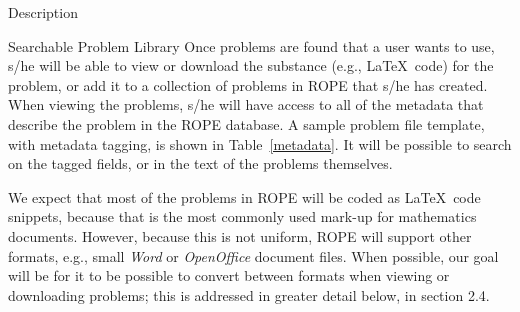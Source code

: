 \documentclass[11pt]{article}
\begin{document}
\begin{section}{Description}
\begin{subsection}{Searchable Problem Library}
Once problems are found that a user wants to use, s/he will be able to
view or download the substance (e.g., \LaTeX\ code) for the problem, or
add it to a collection of problems in ROPE that s/he has created.  When
viewing the problems, s/he will have access to all of the metadata that
describe the problem in the ROPE database.  A sample problem file
template, with metadata tagging, is shown in Table~\ref{metadata}.  It
will be possible to search on the tagged fields, or in the text of the
problems themselves.

We expect that most of the problems in ROPE will be coded as \LaTeX\ code
snippets, because that is the most commonly used mark-up for mathematics
documents.  However, because this is not uniform, ROPE will support other
formats, e.g., small \emph{Word} or \emph{OpenOffice} document files.
When possible, our goal will be for it to be possible to convert between
formats when viewing or downloading problems; this is addressed in greater
detail below, in section 2.4.




\end{subsection}
\end{section}
\end{document}
